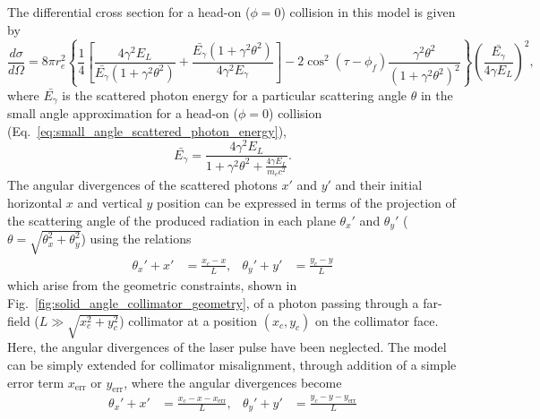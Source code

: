 \documentclass[../main.tex]{subfiles}
\begin{document}
The differential cross section for a head-on ($\phi=0$) collision in this model is given by
\begin{equation}
\frac{d\sigma}{d\Omega} = 8\pi r_{e}^{2}\left\{\frac{1}{4}\left[\frac{4\gamma^{2}E_{L}}{\bar{E_{\gamma}}\left(1+\gamma^{2}\theta^{2}\right)}+\frac{\bar{E_{\gamma}}\left(1+\gamma^{2}\theta^{2}\right)}{4\gamma^{2}E_{\gamma}}\right]-2\cos^{2}\left(\tau-\phi_{f}\right)\frac{\gamma^{2}\theta^{2}}{\left(1+\gamma^{2}\theta^{2}\right)^{2}}\right\}\left(\frac{\bar{E_{\gamma}}}{4\gamma E_{L}}\right)^{2},
\label{eq:sun_differential_cross_section}    
\end{equation}
where $\bar{E_{\gamma}}$ is the scattered photon energy for a particular scattering angle $\theta$ in the small angle approximation for a head-on ($\phi=0$) collision (Eq.~\ref{eq:small_angle_scattered_photon_energy}),
\begin{equation}
\bar{E_{\gamma}} = \frac{4\gamma^{2}E_{L}}{1+\gamma^{2}\theta^{2}+\frac{4\gamma E_{L}}{m_{e}c^{2}}}.
\label{eq:sun_Egamma_bar}    
\end{equation}
The angular divergences of the scattered photons $x'$ and $y'$ and their initial horizontal $x$ and vertical $y$ position can be expressed in terms of the projection of the scattering angle of the produced radiation in each plane $\theta_{x}'$ and $\theta_{y}'$ ($\theta = \sqrt{\theta_{x}^{2}+\theta_{y}^{2}}$) using the relations
\begin{align}
\theta_{x}' + x' &= \frac{x_{c}-x}{L}, & \theta_{y}' + y' &= \frac{y_{c}-y}{L}
\label{eq:sun_angular_divergence}    
\end{align}
which arise from the geometric constraints, shown in Fig.~\ref{fig:solid_angle_collimator_geometry}, of a photon passing through a far-field ($L \gg \sqrt{x_{c}^{2}+y_{c}^{2}}$) collimator at a position $\left(x_{c},y_{c}\right)$ on the collimator face. Here, the angular divergences of the laser pulse have been neglected. The model can be simply extended for collimator misalignment, through addition of a simple error term \cite{sun2009characterizations} $x_{\mathrm{err}}$ or $y_{\mathrm{err}}$, where the angular divergences become
\begin{align}
\theta_{x}' + x' &= \frac{x_{c}-x-x_{\mathrm{err}}}{L}, &
\theta_{y}' + y' &= \frac{y_{c}-y-y_{\mathrm{err}}}{L}
\label{eq:sun_collimator_misallignment}    
\end{align}
\end{document}

